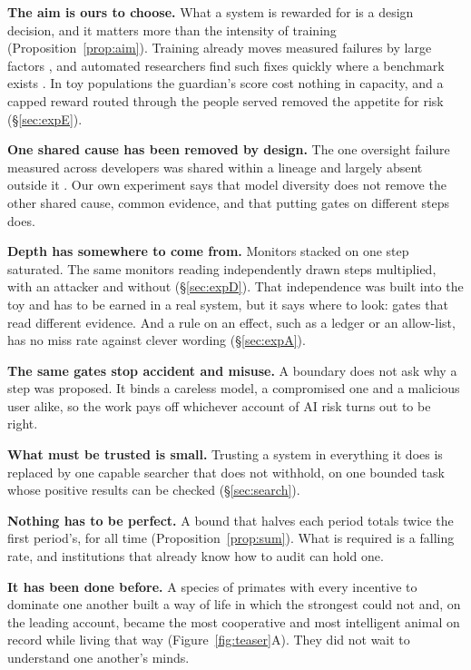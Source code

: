 \documentclass[10pt,twocolumn]{article}
\theoremstyle{plain}
\theoremstyle{definition}
\newcommand{\para}[1]{\smallskip\noindent\textbf{#1}\enspace}
\begin{document}
\para{The aim is ours to choose.} What a system is rewarded for is a design decision, and it
matters more than the intensity of training (Proposition~\ref{prop:aim}). Training already
moves measured failures by large factors \cite{schoen2025}, and automated researchers find
such fixes quickly where a benchmark exists \cite{chen2026aar}. In toy populations the guardian's score
cost nothing in capacity, and a capped reward routed through the people served removed the
appetite for risk (\S\ref{sec:expE}).

\para{One shared cause has been removed by design.} The one oversight failure measured
across developers was shared within a lineage and largely absent outside it
\cite{anthropic2026judges}. Our own experiment says that model diversity does not remove the
other shared cause, common evidence, and that putting gates on different steps does.

\para{Depth has somewhere to come from.} Monitors stacked on one step saturated. The same
monitors reading independently drawn steps multiplied, with an attacker and without
(\S\ref{sec:expD}). That independence was built into the toy and has to be earned in a real
system, but it says where to look: gates that read different evidence. And a rule on an
effect, such as a ledger or an allow-list, has no miss rate against clever wording
(\S\ref{sec:expA}).

\para{The same gates stop accident and misuse.} A boundary does not ask why a step was
proposed. It binds a careless model, a compromised one and a malicious user alike, so the
work pays off whichever account of AI risk turns out to be right.

\para{What must be trusted is small.} Trusting a system in everything it does is replaced by
one capable searcher that does not withhold, on one bounded task whose positive results can
be checked (\S\ref{sec:search}).

\para{Nothing has to be perfect.} A bound that halves each period totals twice the first
period's, for all time (Proposition~\ref{prop:sum}). What is required is a falling rate, and
institutions that already know how to audit can hold one.

\para{It has been done before.} A species of primates with every incentive to dominate one
another built a way of life in which the strongest could not and, on the leading account,
became the most cooperative and most intelligent animal on record while living that way
(Figure~\ref{fig:teaser}A). They did not wait to understand one another's minds.
\end{document}
